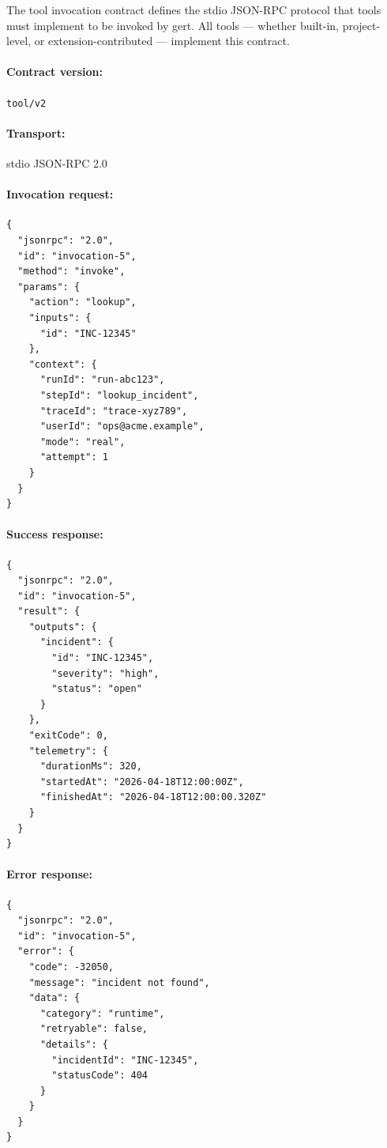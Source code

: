 The tool invocation contract defines the stdio JSON-RPC protocol that tools
must implement to be invoked by gert.  All tools — whether built-in,
project-level, or extension-contributed — implement this contract.

\paragraph{Contract version:} \texttt{tool/v2}

\paragraph{Transport:} stdio JSON-RPC 2.0

\paragraph{Invocation request:}

\begin{verbatim}
{
  "jsonrpc": "2.0",
  "id": "invocation-5",
  "method": "invoke",
  "params": {
    "action": "lookup",
    "inputs": {
      "id": "INC-12345"
    },
    "context": {
      "runId": "run-abc123",
      "stepId": "lookup_incident",
      "traceId": "trace-xyz789",
      "userId": "ops@acme.example",
      "mode": "real",
      "attempt": 1
    }
  }
}
\end{verbatim}

\paragraph{Success response:}

\begin{verbatim}
{
  "jsonrpc": "2.0",
  "id": "invocation-5",
  "result": {
    "outputs": {
      "incident": {
        "id": "INC-12345",
        "severity": "high",
        "status": "open"
      }
    },
    "exitCode": 0,
    "telemetry": {
      "durationMs": 320,
      "startedAt": "2026-04-18T12:00:00Z",
      "finishedAt": "2026-04-18T12:00:00.320Z"
    }
  }
}
\end{verbatim}

\paragraph{Error response:}

\begin{verbatim}
{
  "jsonrpc": "2.0",
  "id": "invocation-5",
  "error": {
    "code": -32050,
    "message": "incident not found",
    "data": {
      "category": "runtime",
      "retryable": false,
      "details": {
        "incidentId": "INC-12345",
        "statusCode": 404
      }
    }
  }
}
\end{verbatim}


